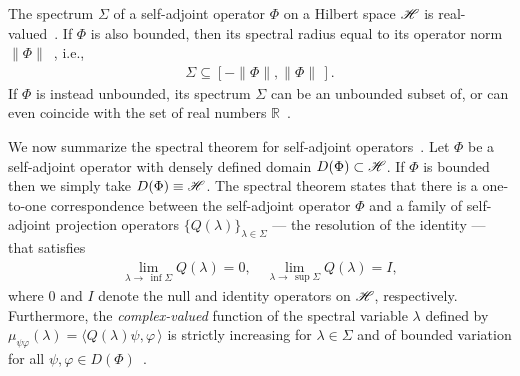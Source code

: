 \documentclass[amsa]{ipart}
\begin{document}
The spectrum $\Sigma$ of a self-adjoint operator $\Phi$ on a Hilbert space
$\mathscr{H}$ is real-valued~\cite{Reed-1980,Stone:64}. If $\Phi$ is also bounded,
then its spectral radius equal to its operator norm
$\|\Phi\|$~\cite{Reed-1980}, i.e., 
%
\begin{align}\label{eq:Spectral_Radius_Phi}
  \Sigma\subseteq[-\|\Phi\|,\|\Phi\|\,].
\end{align}
%
If $\Phi$ is instead unbounded, its spectrum $\Sigma$ can be an unbounded subset of,
or can even coincide with the set of real numbers
$\mathbb{R}$~\cite{Stone:64}.




We now summarize the spectral theorem for self-adjoint
operators~\cite{Stone:64}. Let $\Phi$ be a self-adjoint operator with
densely defined domain $D(\Phi)\subset\mathscr{H}$. If $\Phi$ is bounded
then we simply take $D(\Phi)\equiv\mathscr{H}$. The spectral theorem states that 
there is a one-to-one correspondence between the self-adjoint
operator $\Phi$ and a family of self-adjoint projection operators
$\{Q(\lambda)\}_{\lambda\in\Sigma}$ --- the resolution of the identity --- that
satisfies~\cite{Stone:64} 
%
\begin{align}\label{eq:Res_Identity_limits}
  \lim_{\lambda\to\,\inf{\Sigma}}Q(\lambda)=0, \quad
  \lim_{\lambda\to\,\sup{\Sigma}}Q(\lambda)=I,
\end{align}
%
where $0$ and $I$ denote the null and identity operators on $\mathscr{H}$,
respectively. Furthermore, the \emph{complex-valued} function of the
spectral variable $\lambda$ defined by $\mu_{\psi\varphi}(\lambda)=\langle Q(\lambda)\psi,\varphi\,\rangle$ is strictly 
increasing for $\lambda\in\Sigma$ and of bounded variation for all
$\psi,\varphi\in D(\Phi)$~\cite{Stone:64}.
\end{document}
